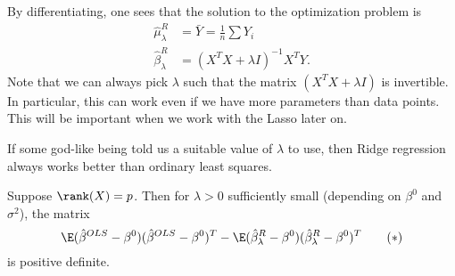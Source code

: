 \documentclass[a4paper]{article}
\begin{document}
By differentiating, one sees that the solution to the optimization problem is
\begin{align*}
  \hat{\mu}_\lambda^R &= \bar{Y} = \frac{1}{n} \sum Y_i\\
  \hat{\beta}^R_\lambda &= (X^T X + \lambda I)^{-1} X^T Y.
\end{align*}
Note that we can always pick $\lambda$ such that the matrix $(X^T X + \lambda I)$ is invertible. In particular, this can work even if we have more parameters than data points. This will be important when we work with the Lasso later on.

If some god-like being told us a suitable value of $\lambda$ to use, then Ridge regression always works better than ordinary least squares.
\begin{thm}
  Suppose $\rank(X) = p$. Then for $\lambda > 0$ sufficiently small (depending on $\beta^0$ and $\sigma^2$), the matrix
  \[
    \E(\hat{\beta}^{OLS} - \beta^0)(\hat{\beta}^{OLS} - \beta^0)^T - \E(\hat{\beta}^{R}_\lambda - \beta^0)(\hat{\beta}^{R}_\lambda - \beta^0)^T \tag{$*$}
  \]
  is positive definite.
\end{thm}
\end{document}
